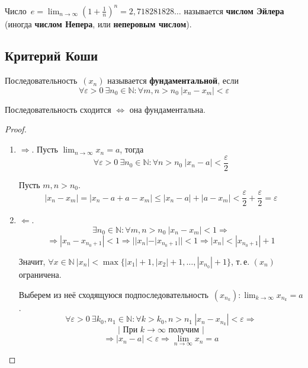   Число~$\displaystyle e = \lim_{n \to \infty} \left( 1 + \frac1n \right)^n = 2{,}718281828\ldots$ называется \textbf{числом Эйлера} (иногда \textbf{числом Непера}, или \textbf{неперовым числом}).

\subsection{Критерий Коши}
 Последовательность~$(x_n)$ называется \textbf{фундаментальной}, если
\begin{equation*}
\forall \varepsilon > 0 \ \exists n_0 \in \mathbb N \colon \forall m, n > n_0 \ |x_n - x_m| < \varepsilon
\end{equation*}

\begin{theorem}
Последовательность сходится $\Leftrightarrow$ она фундаментальна.
\end{theorem}
\begin{proof}
\begin{enumerate}
	\item $\Rightarrow$. Пусть $\displaystyle \lim_{n \to \infty} x_n = a$, тогда
	\begin{equation*}
	\forall \varepsilon > 0 \ \exists n_0 \in \mathbb N \colon \forall n > n_0 \ |x_n - a| < \frac\varepsilon2
	\end{equation*}
	
	Пусть $m, n > n_0$.
	\begin{equation*}
	|x_n - x_m| = |x_n - a + a - x_m| \leqslant |x_n - a| + |a - x_m| < \frac\varepsilon2 + \frac\varepsilon2 = \varepsilon
	\end{equation*}
	
	\item $\Leftarrow$.
	\begin{equation*}
	\exists n_0 \in \mathbb N \colon \forall m, n > n_0 \ |x_n - x_m| < 1 \Rightarrow
	\end{equation*}
	\begin{equation*}
	\Rightarrow |x_n - x_{n_0 + 1}| < 1 \Rightarrow
	||x_n| - |x_{n_0 + 1}|| < 1 \Rightarrow
	|x_n| < |x_{n_0 + 1}| + 1
	\end{equation*}
	
	Значит, $\forall x \in \mathbb N \ |x_n| < \max \{ |x_1| + 1, |x_2| + 1, \ldots, |x_{n_0}| + 1 \}$, т.\,е. $(x_n)$ ограничена.
	
	Выберем из неё сходящуюся подпоследовательность~$\displaystyle (x_{n_k}): \lim_{k \to \infty} x_{n_k} = a$.
	\begin{equation*}
	\forall \varepsilon > 0 \ \exists k_0, n_1 \in \mathbb N \colon \forall k > k_0, n > n_1 \ |x_n - x_{n_k}| < \varepsilon \Rightarrow
	\end{equation*}
	\begin{equation*}
	\left| \text{ При } k \to \infty \text{ получим } \right|
	\end{equation*}
	\begin{equation*}
	\Rightarrow |x_n - a| < \varepsilon \Rightarrow
	\lim_{n \to \infty} x_n = a
	\end{equation*}
\end{enumerate}
\end{proof}